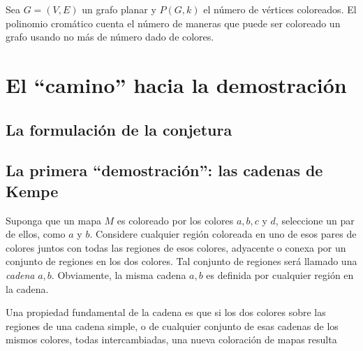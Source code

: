 \documentclass[
	3p,
	times,
	a4paper,
	authoryear
]{elsarticle}%
\begin{document}



\begin{definition}

Sea $G=(V,E)$ un grafo planar y $P(G,k)$ el número de vértices coloreados.
El polinomio cromático cuenta el número de maneras que puede ser coloreado un grafo usando no más de número dado de colores.

\end{definition}

\section{El ``camino'' hacia la demostración}\label{sec:3}

\subsection{La formulación de la conjetura}\label{sec:3.1}

\subsection{La primera ``demostración'': las cadenas de Kempe}\label{sec:3.2}

\begin{definition}
	
	Suponga que un mapa $M$ es coloreado por los colores $a, b, c$ y $d$, seleccione un par de ellos, como $a$ y $b$. Considere cualquier región coloreada en uno de esos pares de colores juntos con todas las regiones de esos colores, adyacente o conexa por un conjunto de regiones en los dos colores. Tal conjunto de regiones será llamado una \emph{cadena} $a,b$. Obviamente, la misma cadena $a,b$ es definida por cualquier región en la cadena.
	
	Una propiedad fundamental de la cadena es que si los dos colores sobre las regiones de una cadena simple, o de cualquier conjunto de esas cadenas de los mismos colores, todas intercambiadas, una nueva coloración de mapas resulta
	
\end{definition}
\end{document}
